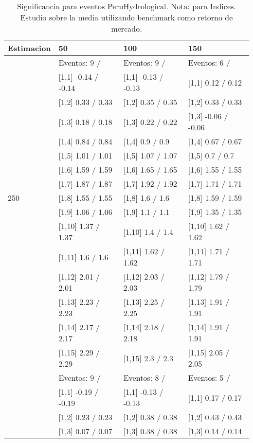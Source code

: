 \begin{table}

\caption{Significancia para eventos PeruHydrological. Nota: para Indices. Estudio sobre la media utilizando benchmark como retorno de mercado.}
\centering
\begin{tabular}[t]{llll}
\toprule
Estimacion & 50 & 100 & 150\\
\midrule
 & Eventos:  9 / & Eventos:  9 / & Eventos:  6 /\\
 & {}[1,1] -0.14  / -0.14 & {}[1,1] -0.13  / -0.13 & {}[1,1] 0.12  / 0.12\\
 & {}[1,2] 0.33  / 0.33 & {}[1,2] 0.35  / 0.35 & {}[1,2] 0.33  / 0.33\\
 & {}[1,3] 0.18  / 0.18 & {}[1,3] 0.22  / 0.22 & {}[1,3] -0.06  / -0.06\\
 & {}[1,4] 0.84  / 0.84 & {}[1,4] 0.9  / 0.9 & {}[1,4] 0.67  / 0.67\\
\addlinespace
 & {}[1,5] 1.01  / 1.01 & {}[1,5] 1.07  / 1.07 & {}[1,5] 0.7  / 0.7\\
 & {}[1,6] 1.59  / 1.59 & {}[1,6] 1.65  / 1.65 & {}[1,6] 1.55  / 1.55\\
 & {}[1,7] 1.87  / 1.87 & {}[1,7] 1.92  / 1.92 & {}[1,7] 1.71  / 1.71\\
250 & {}[1,8] 1.55  / 1.55 & {}[1,8] 1.6  / 1.6 & {}[1,8] 1.59  / 1.59\\
 & {}[1,9] 1.06  / 1.06 & {}[1,9] 1.1  / 1.1 & {}[1,9] 1.35  / 1.35\\
\addlinespace
 & {}[1,10] 1.37  / 1.37 & {}[1,10] 1.4  / 1.4 & {}[1,10] 1.62  / 1.62\\
 & {}[1,11] 1.6  / 1.6 & {}[1,11] 1.62  / 1.62 & {}[1,11] 1.71  / 1.71\\
 & {}[1,12] 2.01  / 2.01 & {}[1,12] 2.03  / 2.03 & {}[1,12] 1.79  / 1.79\\
 & {}[1,13] 2.23  / 2.23 & {}[1,13] 2.25  / 2.25 & {}[1,13] 1.91  / 1.91\\
 & {}[1,14] 2.17  / 2.17 & {}[1,14] 2.18  / 2.18 & {}[1,14] 1.91  / 1.91\\
\addlinespace
 & {}[1,15] 2.29  / 2.29 & {}[1,15] 2.3  / 2.3 & {}[1,15] 2.05  / 2.05\\
 & Eventos:  9 / & Eventos:  8 / & Eventos:  5 /\\
 & {}[1,1] -0.19  / -0.19 & {}[1,1] -0.13  / -0.13 & {}[1,1] 0.17  / 0.17\\
 & {}[1,2] 0.23  / 0.23 & {}[1,2] 0.38  / 0.38 & {}[1,2] 0.43  / 0.43\\
 & {}[1,3] 0.07  / 0.07 & {}[1,3] 0.38  / 0.38 & {}[1,3] 0.14  / 0.14\\

\end{tabular}
\end{table}
